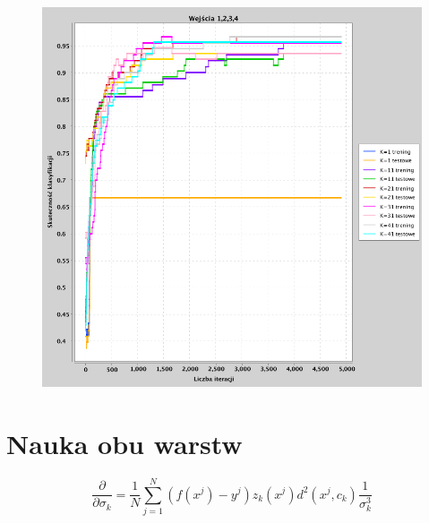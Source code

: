 \documentclass[a4paper, portrait,11pt]{article}
\begin{document}
\begin{figure}[!htb]
\begin{minipage}{0.33\textwidth}
    \caption{\label{fig:41_3_2,3,4}}
  \end{minipage}
  \begin{minipage}{0.33\textwidth}
    \centering
    \includegraphics[width=1\linewidth]{../data/classification4/1/4_1,2,3,4.png}
    \caption{\label{fig:41_4_1,2,3,4}}
  \end{minipage}\hfill
\end{figure}


\section{Nauka obu warstw}
\newcommand{\partialSigma}{\frac{\partial}{\partial{\sigma_{k}}}}
\begin{equation}
  \partialSigma = \frac{1}{N} \sum_{j=1}^{N}  (f(x^j) - y^j) z_k(x^j) d^2(x^j, c_k) \frac{1}{\sigma_{k}^3}
\end{equation}
\end{document}
